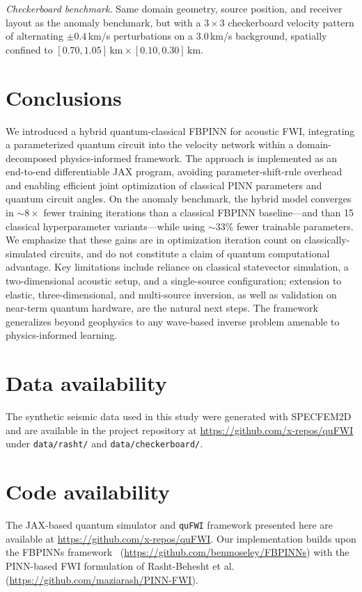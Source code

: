 \textit{Checkerboard benchmark.}
Same domain geometry, source position, and receiver layout as the anomaly benchmark, but with a $3\!\times\!3$ checkerboard velocity pattern of alternating $\pm$$0.4$\,km/s perturbations on a $3.0$\,km/s background, spatially confined to $[0.70, 1.05]\,\text{km} \times [0.10, 0.30]\,\text{km}$.


\section{Conclusions}

We introduced a hybrid quantum-classical FBPINN for acoustic FWI, integrating a parameterized quantum circuit into the velocity network within a domain-decomposed physics-informed framework. The approach is implemented as an end-to-end differentiable JAX program, avoiding parameter-shift-rule overhead and enabling efficient joint optimization of classical PINN parameters and quantum circuit angles. On the anomaly benchmark, the hybrid model converges in $\sim$$8\times$ fewer training iterations than a classical FBPINN baseline---and than 15 classical hyperparameter variants---while using $\sim$$33$\% fewer trainable parameters. We emphasize that these gains are in optimization iteration count on classically-simulated circuits, and do not constitute a claim of quantum computational advantage. Key limitations include reliance on classical statevector simulation, a two-dimensional acoustic setup, and a single-source configuration; extension to elastic, three-dimensional, and multi-source inversion, as well as validation on near-term quantum hardware, are the natural next steps. The framework generalizes beyond geophysics to any wave-based inverse problem amenable to physics-informed learning.


\section*{Data availability}
The synthetic seismic data used in this study were generated with SPECFEM2D~ and are available in the project repository at \url{https://github.com/x-repos/quFWI} under \texttt{data/rasht/} and \texttt{data/checkerboard/}.

\section*{Code availability}
The JAX-based quantum simulator and \texttt{quFWI} framework presented here are available at \url{https://github.com/x-repos/quFWI}. Our implementation builds upon the FBPINNs framework~\cite{Moseley2023} (\url{https://github.com/benmoseley/FBPINNs}) with the PINN-based FWI formulation of Rasht-Behesht et al.~\cite{rahst} (\url{https://github.com/maziarash/PINN-FWI}).

